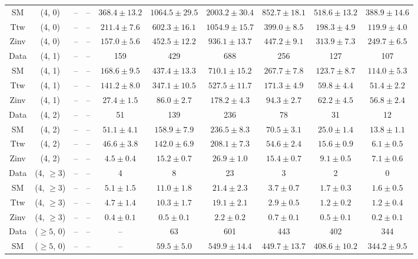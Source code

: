 \begin{table}[h!]
{\begin{tabular}{cccccccccc}
	SM & (4, 0) & -- & -- & $368.4\pm 13.2$ & $1064.5\pm 29.5$ & $2003.2\pm 30.4$ & $852.7\pm 18.1$ & $518.6\pm 13.2$ & $388.9\pm 14.6$ \\[0.5ex] 
	Ttw & (4, 0) & -- & -- & $211.4\pm 7.6$ & $602.3\pm 16.1$ & $1054.9\pm 15.7$ & $399.0\pm 8.5$ & $198.3\pm 4.9$ & $119.9\pm 4.0$ \\[0.5ex] 
	Zinv & (4, 0) & -- & -- & $157.0\pm 5.6$ & $452.5\pm 12.2$ & $936.1\pm 13.7$ & $447.2\pm 9.1$ & $313.9\pm 7.3$ & $249.7\pm 6.5$ \\[0.5ex] 
	Data & (4, 1) & -- & -- & 159 & 429 & 688 & 256 & 127 & 107 \\[0.5ex] 
	SM & (4, 1) & -- & -- & $168.6\pm 9.5$ & $437.4\pm 13.3$ & $710.1\pm 15.2$ & $267.7\pm 7.8$ & $123.7\pm 8.7$ & $114.0\pm 5.3$ \\[0.5ex] 
	Ttw & (4, 1) & -- & -- & $141.2\pm 8.0$ & $347.1\pm 10.5$ & $527.5\pm 11.7$ & $171.3\pm 4.9$ & $59.8\pm 4.4$ & $51.4\pm 2.2$ \\[0.5ex] 
	Zinv & (4, 1) & -- & -- & $27.4\pm 1.5$ & $86.0\pm 2.7$ & $178.2\pm 4.3$ & $94.3\pm 2.7$ & $62.2\pm 4.5$ & $56.8\pm 2.4$ \\[0.5ex] 
	Data & (4, 2) & -- & -- & 51 & 139 & 236 & 78 & 31 & 12 \\[0.5ex] 
	SM & (4, 2) & -- & -- & $51.1\pm 4.1$ & $158.9\pm 7.9$ & $236.5\pm 8.3$ & $70.5\pm 3.1$ & $25.0\pm 1.4$ & $13.8\pm 1.1$ \\[0.5ex] 
	Ttw & (4, 2) & -- & -- & $46.6\pm 3.8$ & $142.0\pm 6.9$ & $208.1\pm 7.3$ & $54.6\pm 2.4$ & $15.6\pm 0.9$ & $6.1\pm 0.5$ \\[0.5ex] 
	Zinv & (4, 2) & -- & -- & $4.5\pm 0.4$ & $15.2\pm 0.7$ & $26.9\pm 1.0$ & $15.4\pm 0.7$ & $9.1\pm 0.5$ & $7.1\pm 0.6$ \\[0.5ex] 
	Data & (4, $\ge3$) & -- & -- & 4 & 8 & 23 & 3 & 2 & 0 \\[0.5ex] 
	SM & (4, $\ge3$) & -- & -- & $5.1\pm 1.5$ & $11.0\pm 1.8$ & $21.4\pm 2.3$ & $3.7\pm 0.7$ & $1.7\pm 0.3$ & $1.6\pm 0.5$ \\[0.5ex] 
	Ttw & (4, $\ge3$) & -- & -- & $4.7\pm 1.4$ & $10.3\pm 1.7$ & $19.1\pm 2.1$ & $2.9\pm 0.5$ & $1.2\pm 0.2$ & $1.2\pm 0.4$ \\[0.5ex] 
	Zinv & (4, $\ge3$) & -- & -- & $0.4\pm 0.1$ & $0.5\pm 0.1$ & $2.2\pm 0.2$ & $0.7\pm 0.1$ & $0.5\pm 0.1$ & $0.2\pm 0.1$ \\[0.5ex] 
	Data & ($\ge5$, 0) & -- & -- & -- & 63 & 601 & 443 & 402 & 344 \\[0.5ex] 
	SM & ($\ge5$, 0) & -- & -- & -- & $59.5\pm 5.0$ & $549.9\pm 14.4$ & $449.7\pm 13.7$ & $408.6\pm 10.2$ & $344.2\pm 9.5$ \\[0.5ex] 

\end{tabular}}
\end{table}
